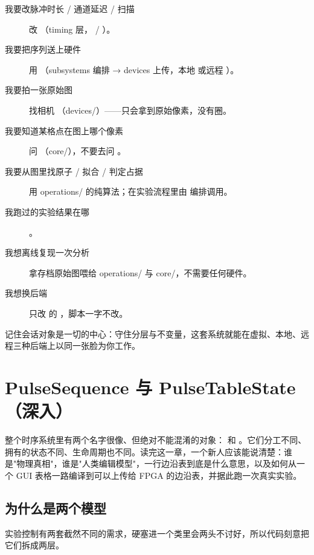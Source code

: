 \documentclass[11pt,oneside,openany]{book}
\begin{document}
\begin{description}
\item[我要改脉冲时长 / 通道延迟 / 扫描] 改 （timing 层， / ）。
\item[我要把序列送上硬件] 用 （subsystems 编排 → devices 上传，本地  或远程 ）。
\item[我要拍一张原始图] 找相机 （devices/）——只会拿到原始像素，没有圈。
\item[我要知道某格点在图上哪个像素] 问 （core/），不要去问 。
\item[我要从图里找原子 / 拟合 / 判定占据] 用 operations/ 的纯算法；在实验流程里由  编排调用。
\item[我跑过的实验结果在哪] 。
\item[我想离线复现一次分析] 拿存档原始图喂给 operations/ 与 core/，不需要任何硬件。
\item[我想换后端] 只改  的 ，脚本一字不改。
\end{description}

记住会话对象是一切的中心：守住分层与不变量，这套系统就能在虚拟、本地、远程三种后端上以同一张脸为你工作。

\chapter{PulseSequence 与 PulseTableState（深入）}

整个时序系统里有两个名字很像、但绝对不能混淆的对象： 和 。它们分工不同、拥有的状态不同、生命周期也不同。读完这一章，一个新人应该能说清楚：谁是"物理真相"，谁是"人类编辑模型"，一行边沿表到底是什么意思，以及如何从一个 GUI 表格一路编译到可以上传给 FPGA 的边沿表，并据此跑一次真实实验。

\section{为什么是两个模型}

实验控制有两套截然不同的需求，硬塞进一个类里会两头不讨好，所以代码刻意把它们拆成两层。
\end{document}
